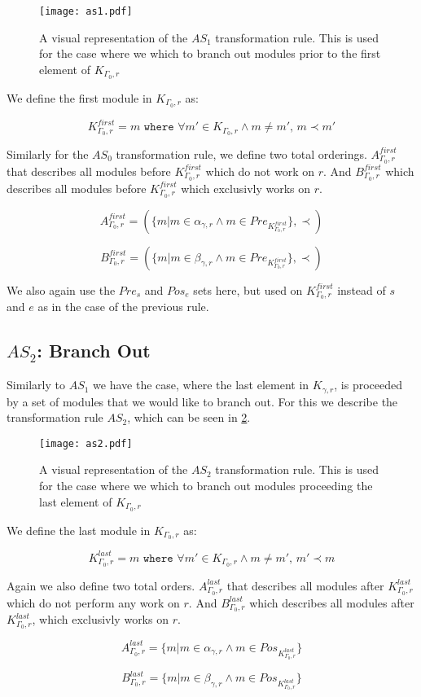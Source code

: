 \begin{figure}[H]
	\centering
	\texttt{[image: as1.pdf]}
	\caption{A visual representation of the $AS_1$ transformation rule. This is used for the case where we which to branch out modules prior to the first element of $K_{\Gamma_0 ,r}$}
	\label{fig:as1}
\end{figure}


 We define the first module in $K_{\Gamma_0 ,r}$ as:

\[K_{\Gamma_0 ,r}^{first} = m \texttt{ where } \forall m' \in K_{\Gamma_0 ,r} \land m \neq m',\, m \prec m' \] 

Similarly for the $AS_0$ transformation rule, we define two total orderings. $A_{\Gamma_0 ,r}^{first}$ that describes all modules before $K_{\Gamma_0 ,r}^{first}$ which do not work on $r$. And $B_{\Gamma_0 ,r}^{first}$ which describes all modules before $K_{\Gamma_0 ,r}^{first}$ which exclusivly works on $r$.

\[ A_{\Gamma_0 ,r}^{first} = (\{m | m \in \alpha_{\gamma ,r}  \land m \in Pre_{K_{\Gamma_0 ,r}^{first}} \}, \prec) \]

\[ B_{\Gamma_0 ,r}^{first} = (\{m | m \in \beta_{\gamma ,r}  \land m \in Pre_{K_{\Gamma_0 ,r}^{first}} \}, \prec) \]

We also again use the $Pre_s$ and $Pos_e$ sets here, but used on $K_{\Gamma_0 ,r}^{first}$ instead of $s$ and $e$ as in the case of the previous rule.
  

\subsection{$AS_2$: Branch Out}
Similarly to $AS_1$ we have the case, where the last element in $K_{\gamma ,r}$, is proceeded by a set of modules that we would like to branch out. For this we describe the transformation rule $AS_2$, which can be seen in \cref{fig:as2}.

\begin{figure}[H]
	\centering
	\texttt{[image: as2.pdf]}
	\caption{A visual representation of the $AS_2$ transformation rule. This is used for the case where we which to branch out modules proceeding the last element of $K_{\Gamma_0 ,r}$}
	\label{fig:as2}
\end{figure}


We define the last module in $K_{\Gamma_0 ,r}$ as:

\[K_{\Gamma_0 ,r}^{last} = m \texttt{ where } \forall m' \in K_{\Gamma_0 ,r} \land m \neq m',\, m' \prec m \] 


Again we also define two total orders. $A_{\Gamma_0 ,r}^{last}$ that describes all modules after $K_{\Gamma_0 ,r}^{last}$ which do not perform any work on $r$. And $B_{\Gamma_0 ,r}^{last}$ which describes all modules after $K_{\Gamma_0 ,r}^{last}$, which exclusivly works on $r$.


\[ A_{\Gamma_0 ,r}^{last} = \{m | m \in \alpha_{\gamma ,r}  \land m \in Pos_{K_{\Gamma_0 ,r}^{last}} \} \]

\[B_{\Gamma_0 ,r}^{last} = \{m | m \in \beta_{\gamma ,r}  \land m \in Pos_{K_{\Gamma_0 ,r}^{last}} \}\]

